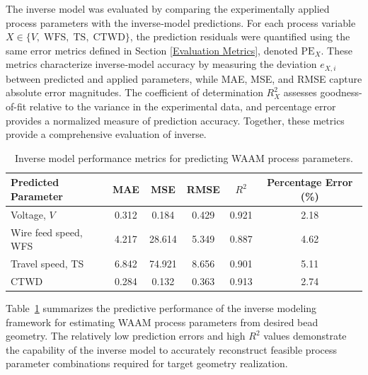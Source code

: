 \documentclass[11pt]{article}
\begin{document}
The inverse model was evaluated by comparing the experimentally applied process
parameters with the inverse‑model predictions. For each process variable 
$X \in \{V,\;\mathrm{WFS},\;\mathrm{TS},\;\mathrm{CTWD}\}$, the prediction residuals were
quantified using the same error metrics defined in Section \ref{Evaluation Metrics}, denoted 
\(\mathrm{PE}_{X}\). These metrics characterize inverse‑model accuracy by measuring the 
deviation \(e_{X,i}\) between predicted and applied parameters, while MAE, MSE, and RMSE 
capture absolute error magnitudes. The coefficient of determination \(R_X^{2}\) assesses 
goodness-of-fit relative to the variance in the experimental data, and percentage error 
provides a normalized measure of prediction accuracy. Together, these metrics provide a 
comprehensive evaluation of inverse.

\begin{table}[htbp]
\centering
\caption{Inverse model performance metrics for predicting WAAM process parameters.}
\label{tab:inverse_model_metrics}

\renewcommand{\arraystretch}{1.2}

\begin{tabular}{lccccc}
\hline

\textbf{Predicted Parameter} &
\textbf{MAE} &
\textbf{MSE} &
\textbf{RMSE} &
\textbf{$R^2$} &
\textbf{Percentage Error (\%)} \\

\hline

Voltage, $V$ 
& 0.312 
& 0.184 
& 0.429 
& 0.921 
& 2.18 \\

Wire feed speed, WFS 
& 4.217 
& 28.614 
& 5.349 
& 0.887 
& 4.62 \\

Travel speed, TS 
& 6.842 
& 74.921 
& 8.656 
& 0.901 
& 5.11 \\

CTWD 
& 0.284 
& 0.132 
& 0.363 
& 0.913 
& 2.74 \\

\hline
\end{tabular}

\end{table}

Table~\ref{tab:inverse_model_metrics} summarizes the predictive performance of the inverse modeling framework for estimating WAAM process parameters from desired bead geometry. The relatively low prediction errors and high $R^2$ values demonstrate the capability of the inverse model to accurately reconstruct feasible process parameter combinations required for target geometry realization.
\end{document}
